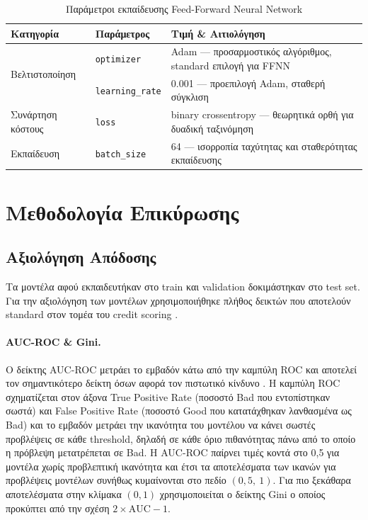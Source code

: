 \begin{table}[htbp]
\centering
\caption{Παράμετροι εκπαίδευσης Feed-Forward Neural Network}
\label{tab:ffnn_params}
\begin{tabular}{llp{7cm}}
\toprule
\textbf{Κατηγορία} & \textbf{Παράμετρος} & \textbf{Τιμή \& Αιτιολόγηση} \\
\midrule
\multirow{2}{*}{Βελτιστοποίηση}
  & \texttt{optimizer}      & Adam \citep{kingma2015adam} --- προσαρμοστικός αλγόριθμος, standard επιλογή για FFNN \\
  & \texttt{learning\_rate} & 0.001 --- προεπιλογή Adam, σταθερή σύγκλιση \\
\midrule
Συνάρτηση κόστους
  & \texttt{loss}           & binary crossentropy --- θεωρητικά ορθή για δυαδική ταξινόμηση \citep{goodfellow2016deep} \\
\midrule
Εκπαίδευση
  & \texttt{batch\_size}    & 64  --- ισορροπία ταχύτητας και σταθερότητας εκπαίδευσης \\
\bottomrule
\end{tabular}
\end{table}

\section{Μεθοδολογία Επικύρωσης}
\label{sec:val_methodology}

\subsection{Αξιολόγηση Απόδοσης}
\label{sec:performance}
Τα μοντέλα αφού εκπαιδευτήκαν στο train και validation δοκιμάστηκαν στο test set.
Για την αξιολόγηση των μοντέλων χρησιμοποιήθηκε πλήθος δεικτών που αποτελούν 
standard στον τομέα του credit scoring \citep{hand1997statistical, anderson2007credit}.


\paragraph{AUC-ROC \& Gini.}
Ο δείκτης AUC-ROC μετράει το εμβαδόν κάτω από την καμπύλη ROC και αποτελεί τον
σημαντικότερο δείκτη όσων αφορά τον πιστωτικό κίνδυνο \citep{hand2009measuring}. Η καμπύλη ROC σχηματίζεται
στον άξονα True Positive Rate (ποσοστό Bad που εντοπίστηκαν σωστά) και False
Positive Rate (ποσοστό Good που κατατάχθηκαν λανθασμένα ως Bad) και το εμβαδόν
μετράει την ικανότητα του μοντέλου να κάνει σωστές προβλέψεις σε κάθε threshold,
δηλαδή σε κάθε όριο πιθανότητας πάνω από το οποίο η πρόβλεψη μετατρέπεται σε Bad.
Η AUC-ROC παίρνει τιμές κοντά στο 0,5 για μοντέλα χωρίς προβλεπτική ικανότητα
και έτσι τα αποτελέσματα των ικανών για προβλέψεις μοντέλων συνήθως κυμαίνονται
στο πεδίο $(0{,}5,\ 1)$. Για πιο ξεκάθαρα αποτελέσματα στην κλίμακα $(0,1)$
χρησιμοποιείται ο δείκτης Gini ο οποίος προκύπτει από την σχέση $2 \times
\text{AUC} - 1$.

